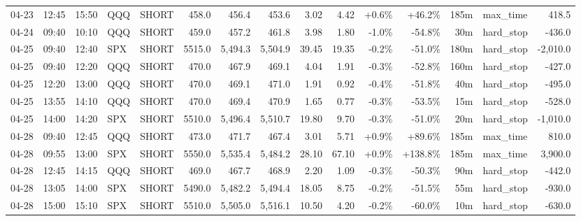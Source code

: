 \documentclass[11pt,a4paper,twoside]{article}
\begin{document}
\begin{landscape}
\begin{center}
\begin{longtable}{>{\color{txtmain}}l l l l l r r r r r r r r >{\color{txtmain}}l r}
04-23 & 12:45 & 15:50 & QQQ & SHORT & 458.0 & 456.4 & 453.6 & 3.02 & 4.42 & \textcolor{wingreen}{+0.6\%} & \textcolor{wingreen}{+46.2\%} & 185m & max\_time & \textcolor{wingreen}{418.5} \\
04-24 & 09:40 & 10:10 & QQQ & SHORT & 459.0 & 457.2 & 461.8 & 3.98 & 1.80 & \textcolor{lossred}{-1.0\%} & \textcolor{lossred}{-54.8\%} & 30m & hard\_stop & \textcolor{lossred}{-436.0} \\
04-25 & 09:40 & 12:40 & SPX & SHORT & 5515.0 & 5,494.3 & 5,504.9 & 39.45 & 19.35 & \textcolor{lossred}{-0.2\%} & \textcolor{lossred}{-51.0\%} & 180m & hard\_stop & \textcolor{lossred}{-2,010.0} \\
04-25 & 09:40 & 12:20 & QQQ & SHORT & 470.0 & 467.9 & 469.1 & 4.04 & 1.91 & \textcolor{lossred}{-0.3\%} & \textcolor{lossred}{-52.8\%} & 160m & hard\_stop & \textcolor{lossred}{-427.0} \\
04-25 & 12:20 & 13:00 & QQQ & SHORT & 470.0 & 469.1 & 471.0 & 1.91 & 0.92 & \textcolor{lossred}{-0.4\%} & \textcolor{lossred}{-51.8\%} & 40m & hard\_stop & \textcolor{lossred}{-495.0} \\
04-25 & 13:55 & 14:10 & QQQ & SHORT & 470.0 & 469.4 & 470.9 & 1.65 & 0.77 & \textcolor{lossred}{-0.3\%} & \textcolor{lossred}{-53.5\%} & 15m & hard\_stop & \textcolor{lossred}{-528.0} \\
04-25 & 14:00 & 14:20 & SPX & SHORT & 5510.0 & 5,496.4 & 5,510.7 & 19.80 & 9.70 & \textcolor{lossred}{-0.3\%} & \textcolor{lossred}{-51.0\%} & 20m & hard\_stop & \textcolor{lossred}{-1,010.0} \\
04-28 & 09:40 & 12:45 & QQQ & SHORT & 473.0 & 471.7 & 467.4 & 3.01 & 5.71 & \textcolor{wingreen}{+0.9\%} & \textcolor{wingreen}{+89.6\%} & 185m & max\_time & \textcolor{wingreen}{810.0} \\
04-28 & 09:55 & 13:00 & SPX & SHORT & 5550.0 & 5,535.4 & 5,484.2 & 28.10 & 67.10 & \textcolor{wingreen}{+0.9\%} & \textcolor{wingreen}{+138.8\%} & 185m & max\_time & \textcolor{wingreen}{3,900.0} \\
04-28 & 12:45 & 14:15 & QQQ & SHORT & 469.0 & 467.7 & 468.9 & 2.20 & 1.09 & \textcolor{lossred}{-0.3\%} & \textcolor{lossred}{-50.3\%} & 90m & hard\_stop & \textcolor{lossred}{-442.0} \\
04-28 & 13:05 & 14:00 & SPX & SHORT & 5490.0 & 5,482.2 & 5,494.4 & 18.05 & 8.75 & \textcolor{lossred}{-0.2\%} & \textcolor{lossred}{-51.5\%} & 55m & hard\_stop & \textcolor{lossred}{-930.0} \\
04-28 & 15:00 & 15:10 & SPX & SHORT & 5510.0 & 5,505.0 & 5,516.1 & 10.50 & 4.20 & \textcolor{lossred}{-0.2\%} & \textcolor{lossred}{-60.0\%} & 10m & hard\_stop & \textcolor{lossred}{-630.0} \\

\end{longtable}
\end{center}
\end{landscape}
\end{document}
